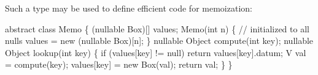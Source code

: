 Such a type may be used to define efficient code for memoization:

\begin{x10}
abstract class Memo  \{
  (nullable Box)[]  values; 
  Memo(int n) \{
    // initialized to all nulls
    values = new (nullable Box)[n]; 
  \}
  nullable Object compute(int key); 
  nullable Object lookup(int key) \{ 
   if (values[key] != null) 
     return values[key].datum;
   V val = compute(key);
   values[key] = new Box(val);
   return val;
  \}
\}
\end{x10}



 


